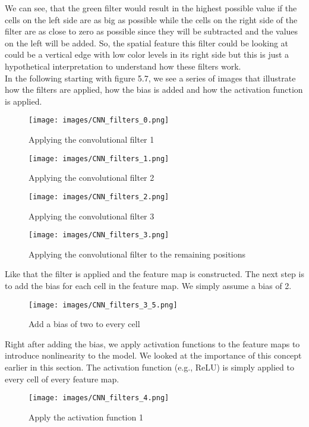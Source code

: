 \documentclass[a4paper,12pt]{report}
\begin{document}
We can see, that the green filter would result in the highest possible value if the cells on the left side are as big as possible while the cells on the right side of the filter are as close to zero as possible since they will be subtracted and the values on the left will be added. So, the spatial feature this filter could be looking at could be a vertical edge with low color levels in its right side but this is just a hypothetical interpretation to understand how these filters work.\\
	
In the following starting with figure 5.7, we see a series of images that illustrate how the filters are applied, how the bias is added and how the activation function is applied.
\begin{figure}[htbp]
  \centering
  \texttt{[image: images/CNN\_filters\_0.png]}
  \caption{Applying the convolutional filter 1}
  \label{fig:fullwidth}
\end{figure}
	
\begin{figure}[htbp]
  \centering
  \texttt{[image: images/CNN\_filters\_1.png]}
  \caption{Applying the convolutional filter 2}
  \label{fig:fullwidth}
\end{figure}

\begin{figure}[htbp]
  \centering
  \texttt{[image: images/CNN\_filters\_2.png]}
  \caption{Applying the convolutional filter 3}
  \label{fig:fullwidth}
\end{figure}

\begin{figure}[htbp]
  \centering
  \texttt{[image: images/CNN\_filters\_3.png]}
  \caption{Applying the convolutional filter to the remaining positions}
  \label{fig:fullwidth}
\end{figure}
\FloatBarrier
Like that the filter is applied and the feature map is constructed. The next step is to add the bias for each cell in the feature map. We simply assume a bias of 2.

\begin{figure}[htbp]
  \centering
  \texttt{[image: images/CNN\_filters\_3\_5.png]}
  \caption{Add a bias of two to every cell}
  \label{fig:fullwidth}
\end{figure}

\FloatBarrier
Right after adding the bias, we apply activation functions to the feature maps to introduce nonlinearity to the model. We looked at the importance of this concept earlier in this section. The activation function (e.g., ReLU) is simply applied to every cell of every feature map. 
\begin{figure}[htbp]
  \centering
  \texttt{[image: images/CNN\_filters\_4.png]}
  \caption{Apply the activation function 1}
  \label{fig:fullwidth}
\end{figure}
\end{document}
